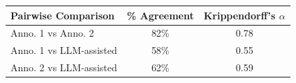 \begin{tabular}{lcc}
\toprule
\textbf{Pairwise Comparison} & \textbf{\% Agreement} & \textbf{Krippendorff's $\alpha$} \\
\midrule
Anno. 1 vs Anno. 2 & 82\% & 0.78 \\
Anno. 1 vs LLM-assisted & 58\% & 0.55 \\
Anno. 2 vs LLM-assisted & 62\% & 0.59 \\
\bottomrule
\end{tabular}